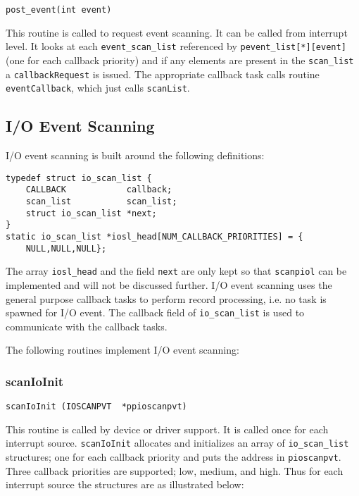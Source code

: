 \begin{verbatim}
post_event(int event)
\end{verbatim}

This routine is called to request event scanning.
It can be called from interrupt level.
It looks at each \verb|event_scan_list| referenced by \verb|pevent_list[*][event]| (one for each callback priority) and if any elements are present in the \verb|scan_list| a \verb|callbackRequest| is issued.
The appropriate callback task calls routine \verb|eventCallback|, which just calls \verb|scanList|. 

\subsection{I/O Event Scanning}

I/O event scanning is built around the following definitions:

\begin{verbatim}
typedef struct io_scan_list {
    CALLBACK            callback;
    scan_list           scan_list;
    struct io_scan_list *next;
}
static io_scan_list *iosl_head[NUM_CALLBACK_PRIORITIES] = {
    NULL,NULL,NULL};
\end{verbatim}

The array \verb|iosl_head| and the field \verb|next| are only kept so that \verb|scanpiol| can be implemented and will not be discussed further.
I/O event scanning uses the general purpose callback tasks to perform record processing, i.e. no task is spawned for I/O event.
The callback field of \verb|io_scan_list| is used to communicate with the callback tasks.

The following routines implement I/O event scanning:

\subsubsection{scanIoInit}

\begin{verbatim}
scanIoInit (IOSCANPVT  *ppioscanpvt)
\end{verbatim}

This routine is called by device or driver support.
It is called once for each interrupt source.
\verb|scanIoInit| allocates and initializes an array of \verb|io_scan_list| structures; one for each callback priority and puts the address in \verb|pioscanpvt|.
Three callback priorities are supported; low, medium, and high.
Thus for each interrupt source the structures are as illustrated below:

